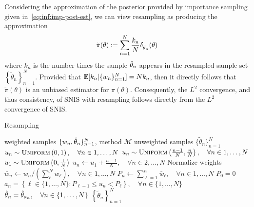 Considering the approximation of the
posterior provided by importance sampling given in~\eqref{eq:inf:imp-post-est}, we can view
resampling as producing the approximation
\begin{align}
\label{eq:inf:resampling-post}
\tilde{\pi}(\theta) := \sum_{n=1}^{N} \frac{k_n}{N} \delta_{\hat{\theta}_n} (\theta)
\end{align}
where $k_n$ is the number times the sample $\hat{\theta}_n$ appears in the resampled sample
set $\left\{\tilde{\theta}_n\right\}_{n=1}^N$.  Provided that $\mathbb{E}[k_n | \{w_n\}_{n=1}^N] = Nk_n$,
then it directly follows that $\tilde{\pi}(\theta)$ is an unbiased estimator for $\hat{\pi}(\theta)$.
Consequently, the $L^2$ convergence, and thus consistency, of SNIS with resampling follows
directly from the $L^2$ convergence of SNIS.
	
	\begin{algorithm}[tb]
		\caption{Resampling}
		\label{alg:inf:resampling}
		\begin{spacing}{1.2}
			\begin{algorithmic}[1]
				\renewcommand{\algorithmicrequire}{\textbf{Inputs:}}
				\renewcommand{\algorithmicensure}{\textbf{Outputs:}}				 
				\Require weighted samples $\{w_n,\hat{\theta}_n\}_{n=1}^N$, method $\mathcal{M}$
				\Ensure unweighted samples $\{\tilde{\theta}_n\}_{n=1}^N$
				\State $u_n \sim \textsc{Uniform}\left(0,1\right), \quad \forall n\in1,\dots,N$ \vspace{-3pt}
				\EndCase
				\State $u_n \sim \textsc{Uniform}\left(\frac{n-1}{N},\frac{n}{N}\right), \quad \forall n\in1,\dots,N$
				\vspace{-3pt}
				\EndCase
				\State $u_1 \sim  \textsc{Uniform}\left(0,\frac{1}{N}\right)$
				\State $u_n \leftarrow u_1+\frac{n-1}{N}, \quad \forall n\in2,\dots,N$ \vspace{-3pt}
				\EndCase
				\EndSwitch
				\State Normalize weights $\bar{w}_n \leftarrow w_n/\left(\sum_{\ell}^N w_{\ell}\right), 
				\quad \forall n \in 1,\dots,N$
				\State $P_n \leftarrow \sum_{\ell=1}^n \bar{w}_{\ell}, \quad \forall n\in1,\dots,N$
				\Comment $P_0 =0$
				\State $a_n = \left\{\ell \in \{1,\dots,N\} \colon P_{\ell-1} \le u_n < P_\ell\right\}, \quad \forall n \in \{1,\dots,N\}$
				\State $\tilde{\theta}_n = \hat{\theta}_{a_n}, \quad \forall n \in \{1,\dots,N\}$
				\State \Return $\left\{\tilde{\theta}_n\right\}_{n=1}^N$
			\end{algorithmic}
		\end{spacing}
	\end{algorithm}
	
